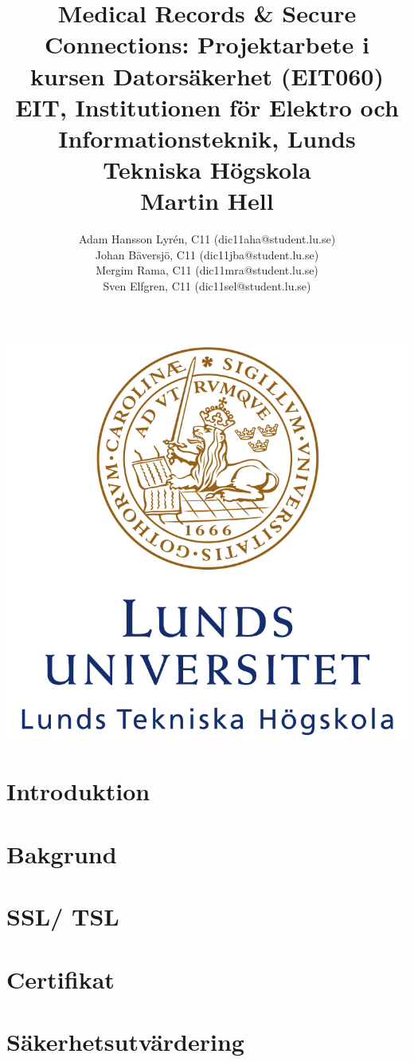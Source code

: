 \documentclass[a4paper]{article}
\title{
	Medical Records \& Secure Connections: Projektarbete i kursen Datorsäkerhet (EIT060)\\
	EIT, Institutionen för Elektro och Informationsteknik, Lunds Tekniska Högskola\\
	Martin Hell}
\author{
Adam Hansson Lyrén, C11 (dic11aha@student.lu.se)\\
Johan Bäversjö, C11 (dic11jba@student.lu.se)\\
Mergim Rama, C11 (dic11mra@student.lu.se)\\
Sven Elfgren, C11 (dic11sel@student.lu.se)\\
}
\begin{document}

\maketitle
\centerline{\includegraphics[scale = 0.6]{LTH.JPG}}
\thispagestyle{empty}
\newpage
\setcounter{page}{1}


\tableofcontents
\newpage

\section{Introduktion}


\section{Bakgrund}


\section{SSL/ TSL}


\section{Certifikat}


\section{Säkerhetsutvärdering}

\end{document}
